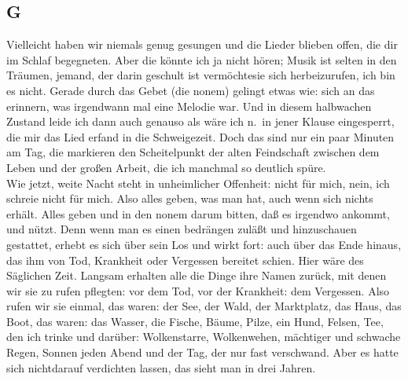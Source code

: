 \documentclass[
]{article}
\author{}
\date{\vspace{-2.5em}}
\begin{document}
\subsection{G}\label{g}

Vielleicht haben wir niemals genug gesungen und die Lieder blieben
offen, die dir im Schlaf begegneten. Aber die könnte ich ja nicht hören;
Musik ist selten in den Träumen, jemand, der darin geschult ist
vermöchtesie sich herbeizurufen, ich bin es nicht. Gerade durch das
Gebet (die nonem) gelingt etwas wie: sich an das erinnern, was
irgendwann mal eine Melodie war. Und in diesem halbwachen Zustand leide
ich dann auch genauso als wäre ich n.~in jener Klause eingesperrt, die
mir das Lied erfand in die Schweigezeit. Doch das sind nur ein paar
Minuten am Tag, die markieren den Scheitelpunkt der alten Feindschaft
zwischen dem Leben und der großen Arbeit, die ich manchmal so deutlich
spüre.\\
Wie jetzt, weite Nacht steht in unheimlicher Offenheit: nicht für mich,
nein, ich schreie nicht für mich. Also alles geben, was man hat, auch
wenn sich nichts erhält. Alles geben und in den nonem darum bitten, daß
es irgendwo ankommt, und nützt. Denn wenn man es einen bedrängen zuläßt
und hinzuschauen gestattet, erhebt es sich über sein Los und wirkt fort:
auch über das Ende hinaus, das ihm von Tod, Krankheit oder Vergessen
bereitet schien. Hier wäre des Säglichen Zeit. Langsam erhalten alle die
Dinge ihre Namen zurück, mit denen wir sie zu rufen pflegten: vor dem
Tod, vor der Krankheit: dem Vergessen. Also rufen wir sie einmal, das
waren: der See, der Wald, der Marktplatz, das Haus, das Boot, das waren:
das Wasser, die Fische, Bäume, Pilze, ein Hund, Felsen, Tee, den ich
trinke und darüber: Wolkenstarre, Wolkenwehen, mächtiger und schwache
Regen, Sonnen jeden Abend und der Tag, der nur fast verschwand. Aber es
hatte sich nichtdarauf verdichten lassen, das sieht man in drei Jahren.
\end{document}

